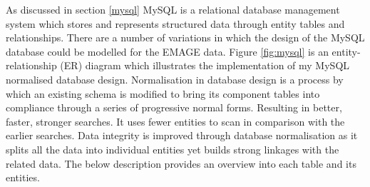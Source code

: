 As discussed in section \ref{mysql} MySQL is a relational database management system which stores and represents structured data through entity tables and relationships. There are a number of variations in which the design of the MySQL database could be modelled for the EMAGE data. Figure \ref{fig:mysql} is an entity-relationship (ER) diagram which illustrates the implementation of my MySQL normalised database design. Normalisation in database design is a process by which an existing schema is modified to bring its component tables into compliance through a series of progressive normal forms. Resulting in better, faster, stronger searches. It uses fewer entities to scan in comparison with the earlier searches. Data integrity is improved through database normalisation as it splits all the data into individual entities yet builds strong linkages with the related data. The below description provides an overview into each table and its entities.

